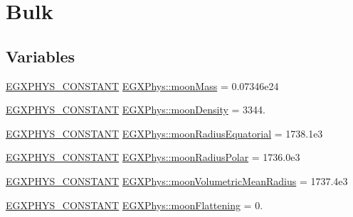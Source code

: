 \hypertarget{group___e_g_x_phys-_constants-_astrophysics-_solar_system-_moon-_bulk}{}\section{Bulk}
\label{group___e_g_x_phys-_constants-_astrophysics-_solar_system-_moon-_bulk}
\subsection*{Variables}
\begin{DoxyCompactItemize}
\item 
\mbox{\hyperlink{group___e_g_x_phys-_constants-_macros_ga76980d288494ce1714c9ac68a95ba702}{E\+G\+X\+P\+H\+Y\+S\+\_\+\+C\+O\+N\+S\+T\+A\+NT}} \mbox{\hyperlink{group___e_g_x_phys-_constants-_astrophysics-_solar_system-_moon-_bulk_ga0e4476345121e793942cc7c233aaaf9e}{E\+G\+X\+Phys\+::moon\+Mass}} = 0.\+07346e24
\item 
\mbox{\hyperlink{group___e_g_x_phys-_constants-_macros_ga76980d288494ce1714c9ac68a95ba702}{E\+G\+X\+P\+H\+Y\+S\+\_\+\+C\+O\+N\+S\+T\+A\+NT}} \mbox{\hyperlink{group___e_g_x_phys-_constants-_astrophysics-_solar_system-_moon-_bulk_ga737875bb775588bea086e174ae8082e0}{E\+G\+X\+Phys\+::moon\+Density}} = 3344.
\item 
\mbox{\hyperlink{group___e_g_x_phys-_constants-_macros_ga76980d288494ce1714c9ac68a95ba702}{E\+G\+X\+P\+H\+Y\+S\+\_\+\+C\+O\+N\+S\+T\+A\+NT}} \mbox{\hyperlink{group___e_g_x_phys-_constants-_astrophysics-_solar_system-_moon-_bulk_gae64b2ac5706df380350586a156c2fef9}{E\+G\+X\+Phys\+::moon\+Radius\+Equatorial}} = 1738.\+1e3
\item 
\mbox{\hyperlink{group___e_g_x_phys-_constants-_macros_ga76980d288494ce1714c9ac68a95ba702}{E\+G\+X\+P\+H\+Y\+S\+\_\+\+C\+O\+N\+S\+T\+A\+NT}} \mbox{\hyperlink{group___e_g_x_phys-_constants-_astrophysics-_solar_system-_moon-_bulk_ga63eac19f90f28a0639f9a81eaac65d62}{E\+G\+X\+Phys\+::moon\+Radius\+Polar}} = 1736.\+0e3
\item 
\mbox{\hyperlink{group___e_g_x_phys-_constants-_macros_ga76980d288494ce1714c9ac68a95ba702}{E\+G\+X\+P\+H\+Y\+S\+\_\+\+C\+O\+N\+S\+T\+A\+NT}} \mbox{\hyperlink{group___e_g_x_phys-_constants-_astrophysics-_solar_system-_moon-_bulk_ga02996f309aca6182877833bff0d325dd}{E\+G\+X\+Phys\+::moon\+Volumetric\+Mean\+Radius}} = 1737.\+4e3
\item 
\mbox{\hyperlink{group___e_g_x_phys-_constants-_macros_ga76980d288494ce1714c9ac68a95ba702}{E\+G\+X\+P\+H\+Y\+S\+\_\+\+C\+O\+N\+S\+T\+A\+NT}} \mbox{\hyperlink{group___e_g_x_phys-_constants-_astrophysics-_solar_system-_moon-_bulk_ga57e50ee2a3244104e2f6697d035a8680}{E\+G\+X\+Phys\+::moon\+Flattening}} = 0.

\end{DoxyCompactItemize}
